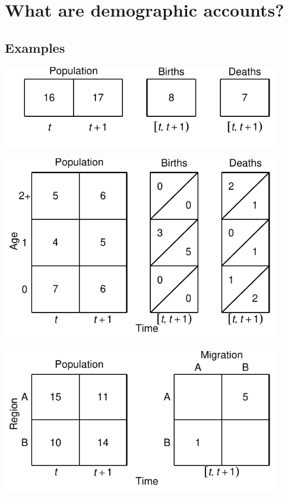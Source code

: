 \documentclass[USenglish]{article}
\begin{document}
\section{What are demographic accounts?}

\subsection{Examples}


\includegraphics[width=0.9\textwidth]{figures_accounts/fig_account_noage.pdf}

\includegraphics[width=0.9\textwidth]{figures_accounts/fig_account_withage.pdf}

\includegraphics[width=0.9\textwidth]{figures_accounts/fig_account_region.pdf}
\end{document}
